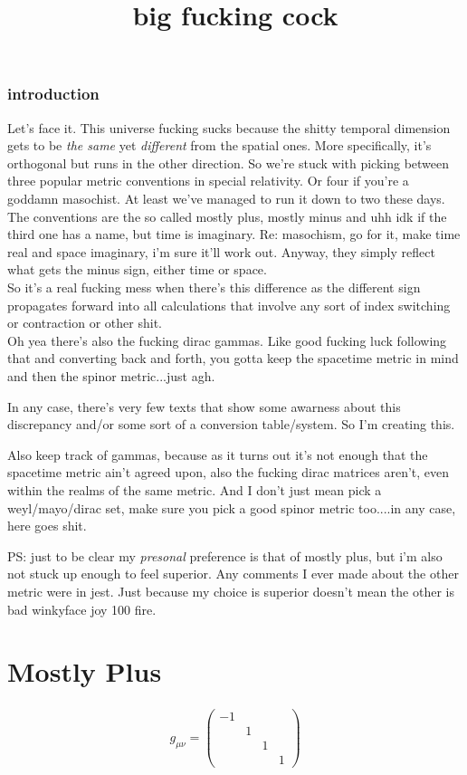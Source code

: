 \documentclass[10pt]{article}
\begin{document}
\title{big fucking cock}	
\author{}
\date{}
\maketitle

\section*{introduction}%
\label{sec:introduction}
Let's face it. This universe fucking sucks because the shitty temporal dimension gets to be \textit{the same} yet \textit{different} from the spatial ones. More specifically, it's orthogonal but runs in the other direction. So we're stuck with picking between three popular metric conventions in special relativity. Or four if you're a goddamn masochist. At least we've managed to run it down to two these days.\\
The conventions are the so called mostly plus, mostly minus and uhh idk if the third one has a name, but time is imaginary. Re: masochism, go for it, make time real and space imaginary, i'm sure it'll work out. Anyway, they simply reflect what gets the minus sign, either time or space.\\
So it's a real fucking mess when there's this difference as the different sign propagates forward into all calculations that involve any sort of index switching or contraction or other shit.\\
Oh yea there's also the fucking dirac gammas. Like good fucking luck following that and converting back and forth, you gotta keep the spacetime metric in mind and then the spinor metric...just agh.\par
In any case, there's very few texts that show some awarness about this discrepancy and/or some sort of a conversion table/system. So I'm creating this.\par
Also keep track of gammas, because as it turns out it's not enough that the spacetime metric ain't agreed upon, also the fucking dirac matrices aren't, even within the realms of the same metric. And I don't just mean pick a weyl/mayo/dirac set, make sure you pick a good spinor metric too....in any case, here goes shit.\par
PS: just to be clear my \textit{presonal} preference is that of mostly plus, but i'm also not stuck up enough to feel superior. Any comments I ever made about the other metric were in jest. Just because my choice is superior doesn't mean the other is bad winkyface joy 100 fire.
\part{Mostly Plus}%
\label{prt:mostly_plus}
\begin{align*}
	g_{\mu\nu}= \begin{pmatrix}
		-1 & & &\\
		   & 1 & &\\
		   & & 1 &\\
		   & & & 1
	\end{pmatrix}
\end{align*}
\end{document}
